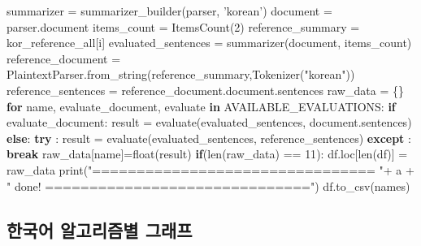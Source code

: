 \documentclass[11pt]{article}
\newenvironment{Shaded}{}{}
\newcommand{\KeywordTok}[1]{\textcolor[rgb]{0.00,0.44,0.13}{\textbf{{#1}}}}
\newcommand{\DecValTok}[1]{\textcolor[rgb]{0.25,0.63,0.44}{{#1}}}
\newcommand{\StringTok}[1]{\textcolor[rgb]{0.25,0.44,0.63}{{#1}}}
\newcommand{\NormalTok}[1]{{#1}}
\newcommand{\ControlFlowTok}[1]{\textcolor[rgb]{0.00,0.44,0.13}{\textbf{{#1}}}}
\newcommand{\OperatorTok}[1]{\textcolor[rgb]{0.40,0.40,0.40}{{#1}}}
\newcommand{\BuiltInTok}[1]{{#1}}
\begin{document}
\begin{Shaded}
\begin{Highlighting}[]
\NormalTok{        summarizer }\OperatorTok{=}\NormalTok{ summarizer_builder(parser, }\StringTok{'korean'}\NormalTok{)}
\NormalTok{        document }\OperatorTok{=}\NormalTok{ parser.document}
\NormalTok{        items_count }\OperatorTok{=}\NormalTok{ ItemsCount(}\DecValTok{2}\NormalTok{)}
\NormalTok{        reference_summary }\OperatorTok{=}\NormalTok{ kor_reference_all[i]}
\NormalTok{        evaluated_sentences }\OperatorTok{=}\NormalTok{ summarizer(document, items_count)}
\NormalTok{        reference_document }\OperatorTok{=}\NormalTok{ PlaintextParser.from_string(reference_summary,Tokenizer(}\StringTok{"korean"}\NormalTok{))}
\NormalTok{        reference_sentences }\OperatorTok{=}\NormalTok{ reference_document.document.sentences}
\NormalTok{        raw_data }\OperatorTok{=}\NormalTok{ \{\}}
        \ControlFlowTok{for}\NormalTok{ name, evaluate_document, evaluate }\KeywordTok{in}\NormalTok{ AVAILABLE_EVALUATIONS:}
            \ControlFlowTok{if}\NormalTok{ evaluate_document:}
\NormalTok{                result }\OperatorTok{=}\NormalTok{ evaluate(evaluated_sentences, document.sentences)}
            \ControlFlowTok{else}\NormalTok{:}
                \ControlFlowTok{try}\NormalTok{ :}
\NormalTok{                    result }\OperatorTok{=}\NormalTok{ evaluate(evaluated_sentences, reference_sentences)}
                \ControlFlowTok{except}\NormalTok{ :}
                    \ControlFlowTok{break}
\NormalTok{            raw_data[name]}\OperatorTok{=}\BuiltInTok{float}\NormalTok{(result)}
        \ControlFlowTok{if}\NormalTok{(}\BuiltInTok{len}\NormalTok{(raw_data) }\OperatorTok{==} \DecValTok{11}\NormalTok{):}
\NormalTok{            df.loc[}\BuiltInTok{len}\NormalTok{(df)] }\OperatorTok{=}\NormalTok{ raw_data}
    \BuiltInTok{print}\NormalTok{(}\StringTok{"================================ "}\OperatorTok{+}\NormalTok{ a }\OperatorTok{+} \StringTok{" done! =============================="}\NormalTok{)}
\NormalTok{    df.to_csv(names)}
\end{Highlighting}
\end{Shaded}

    \hypertarget{uxd55cuxad6duxc5b4-uxc54cuxace0uxb9acuxc998uxbcc4-uxadf8uxb798uxd504}{%
\subsection{한국어 알고리즘별
그래프}\label{uxd55cuxad6duxc5b4-uxc54cuxace0uxb9acuxc998uxbcc4-uxadf8uxb798uxd504}}
\end{document}
